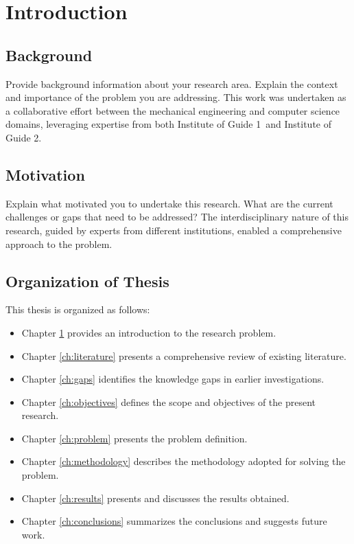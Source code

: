 \documentclass[12pt,a4paper]{report}
\newcommand{\guideIinst}{Institute of Guide 1}
\newcommand{\guideIIinst}{Institute of Guide 2}
\begin{document}
\chapter{Introduction}
\label{ch:introduction}
\thispagestyle{empty} %

\section{Background}
Provide background information about your research area.
Explain the context and importance of the problem you are addressing.
This work was undertaken as a collaborative effort between the mechanical engineering and computer science domains, leveraging expertise from both \guideIinst\ and \guideIIinst.

\section{Motivation}
Explain what motivated you to undertake this research. What are the current challenges or gaps that need to be addressed?
The interdisciplinary nature of this research, guided by experts from different institutions, enabled a comprehensive approach to the problem.

\section{Organization of Thesis}
This thesis is organized as follows:

\begin{itemize}
\item Chapter \ref{ch:introduction} provides an introduction to the research problem.
\item Chapter \ref{ch:literature} presents a comprehensive review of existing literature.
\item Chapter \ref{ch:gaps} identifies the knowledge gaps in earlier investigations.
\item Chapter \ref{ch:objectives} defines the scope and objectives of the present research.
\item Chapter \ref{ch:problem} presents the problem definition.
\item Chapter \ref{ch:methodology} describes the methodology adopted for solving the problem.
\item Chapter \ref{ch:results} presents and discusses the results obtained.
\item Chapter \ref{ch:conclusions} summarizes the conclusions and suggests future work.
\end{itemize}
\end{document}
